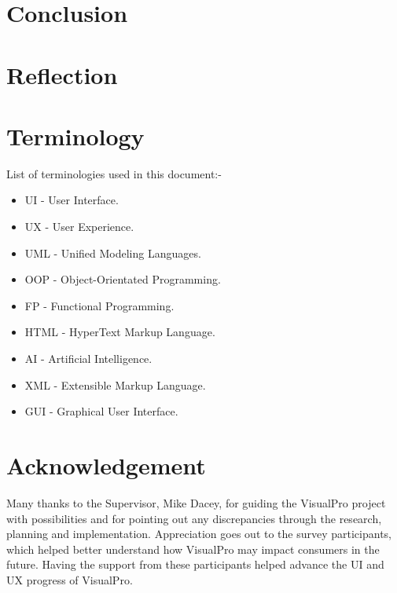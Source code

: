 \documentclass[conference]{IEEEtran}
\begin{document}
    \section{Conclusion}

    \section{Reflection}

    \section{Terminology}
      List of terminologies used in this document:-
      \begin{itemize}
        \item UI - User Interface.
        \item UX - User Experience.
        \item UML - Unified Modeling Languages.
        \item OOP - Object-Orientated Programming.
        \item FP - Functional Programming.
        \item HTML - HyperText Markup Language.
        \item AI - Artificial Intelligence.
        \item XML - Extensible Markup Language.
        \item GUI - Graphical User Interface.
      \end{itemize}

    \section*{Acknowledgement}
    Many thanks to the Supervisor, Mike Dacey, for guiding the VisualPro project with possibilities and for pointing out any discrepancies through the research, planning and implementation. Appreciation goes out to the survey participants, which helped better understand how VisualPro may impact consumers in the future. Having the support from these participants helped advance the UI and UX progress of VisualPro.

	\renewcommand\refname{\section{Reference List}}
	\small{
    }
\end{document}
